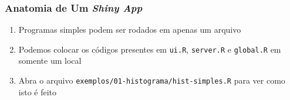 \documentclass[12pt, compress, usetitleprogressbar]{beamer}\usepackage[]{graphicx}\usepackage[]{color}
\begin{document}












\begin{frame}

\frametitle{Anatomia de Um \emph{Shiny App}}

\begin{enumerate}[label=$\bullet$, leftmargin=*]

  \item Programas simples podem ser rodados em apenas um arquivo

  \item Podemos colocar os códigos presentes em \texttt{ui.R}, \texttt{server.R} e \texttt{global.R} em somente um local

  \item Abra o arquivo \texttt{exemplos/01-histograma/hist-simples.R} para ver como isto é feito

\end{enumerate}

\end{frame}







\begin{comment}


\begin{frame}[fragile]

\frametitle{Anatomia de Um \emph{Shiny App}}



\end{frame}


\end{comment}














\end{document}
